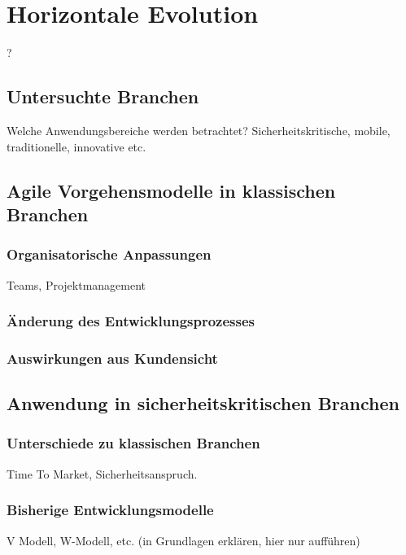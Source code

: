\chapter{Horizontale Evolution} %

?

\section{Untersuchte Branchen}

Welche Anwendungsbereiche werden betrachtet? 
Sicherheitskritische, mobile, traditionelle, innovative etc.

\section{Agile Vorgehensmodelle in klassischen Branchen}

\subsection{Organisatorische Anpassungen}

Teams, Projektmanagement

\subsection{Änderung des Entwicklungsprozesses}

\subsection{Auswirkungen aus Kundensicht}


\section{Anwendung in sicherheitskritischen Branchen}

\subsection{Unterschiede zu klassischen Branchen}

Time To Market, Sicherheitsanspruch.

\subsection{Bisherige Entwicklungsmodelle}

V Modell, W-Modell, etc. (in Grundlagen erklären, hier nur aufführen)

